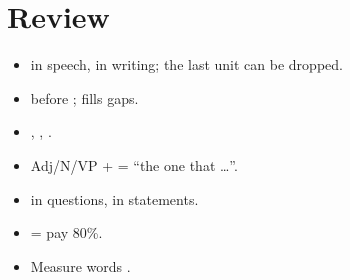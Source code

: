 \section*{Review}
\begin{itemize}
  \item {} in speech,  in writing; the last unit can be dropped.
  \item {} before ;  fills gaps.
  \item {}, , .
  \item Adj/N/VP +  = ``the one that \ldots''.
  \item {} in questions,  in statements.
  \item {} = pay 80\%.
  \item Measure words .
\end{itemize}
